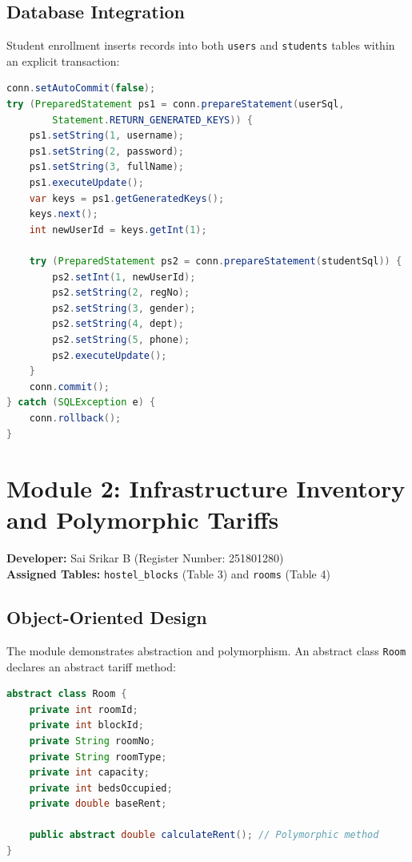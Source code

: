 \documentclass[12pt,a4paper]{report}
\begin{document}
\subsection{Database Integration}
Student enrollment inserts records into both \texttt{users} and \texttt{students} tables within an explicit transaction:
\begin{lstlisting}[language=Java]
conn.setAutoCommit(false);
try (PreparedStatement ps1 = conn.prepareStatement(userSql, 
        Statement.RETURN_GENERATED_KEYS)) {
    ps1.setString(1, username);
    ps1.setString(2, password);
    ps1.setString(3, fullName);
    ps1.executeUpdate();
    var keys = ps1.getGeneratedKeys();
    keys.next();
    int newUserId = keys.getInt(1);

    try (PreparedStatement ps2 = conn.prepareStatement(studentSql)) {
        ps2.setInt(1, newUserId);
        ps2.setString(2, regNo);
        ps2.setString(3, gender);
        ps2.setString(4, dept);
        ps2.setString(5, phone);
        ps2.executeUpdate();
    }
    conn.commit();
} catch (SQLException e) {
    conn.rollback();
}
\end{lstlisting}

\section{Module 2: Infrastructure Inventory and Polymorphic Tariffs}
\textbf{Developer:} Sai Srikar B (Register Number: 251801280)\\
\textbf{Assigned Tables:} \texttt{hostel\_blocks} (Table 3) and \texttt{rooms} (Table 4)

\subsection{Object-Oriented Design}
The module demonstrates abstraction and polymorphism. An abstract class \texttt{Room} declares an abstract tariff method:
\begin{lstlisting}[language=Java]
abstract class Room {
    private int roomId;
    private int blockId;
    private String roomNo;
    private String roomType;
    private int capacity;
    private int bedsOccupied;
    private double baseRent;

    public abstract double calculateRent(); // Polymorphic method
}
\end{lstlisting}
\end{document}
